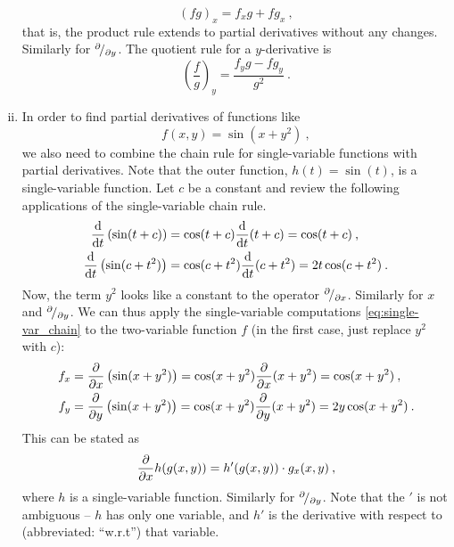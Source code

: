 \begin{remark}
\begin{enumerate}[(i)]
\[ (fg)_x  = f_xg + fg_x \:, \]
that is, the product rule extends to partial derivatives without any changes. Similarly for ${}^{\partial}\!/_{\partial y}$. The quotient rule for a $y$-derivative is
\[ \left( \frac{f}{g} \right)_y = \frac{f_y g-f g_y}{g^2} \:. \]
\item In order to find partial derivatives of functions like
\[ f(x,y) = \sin(x+y^2) \:, \]
we also need to combine the chain rule for single-variable functions with partial derivatives. Note that the outer function, $h(t)=\sin(t)$, is a single-variable function. Let $c$ be a constant and review the following applications of the single-variable chain rule.
\begin{equation}
\label{eq:single-var_chain}
\begin{split}
\displaystyle{\frac{\mathrm{d}}{\mathrm{d}t}}\left(\sin(t+c)\right) & = \cos(t+c) \displaystyle{\frac{\mathrm{d}}{\mathrm{d}t}} (t+c) = \cos(t+c) \:,  \\
\displaystyle{\frac{\mathrm{d}}{\mathrm{d}t}}\left(\sin(c+t^2)\right) & = \cos(c+t^2) \displaystyle{\frac{\mathrm{d}}{\mathrm{d}t}} (c+t^2) = 2t\cos(c+t^2) \:.
\end{split}
\end{equation}
Now, the term $y^2$ looks like a constant to the operator ${}^{\partial}\!/_{\partial x}$. Similarly for $x$ and ${}^{\partial}\!/_{\partial y}$. We can thus apply the single-variable computations \eqref{eq:single-var_chain} to the two-variable function $f$ (in the first case, just replace $y^2$ with $c$):
\begin{equation*}
\begin{split}
f_x & = \displaystyle{\frac{\partial }{\partial x}}\left(\sin(x+y^2)\right) = \cos(x+y^2) \displaystyle{\frac{\partial }{\partial x}} (x+y^2) = \cos(x+y^2) \:,  \\
f_y & = \displaystyle{\frac{\partial }{\partial y}}\left(\sin(x+y^2)\right) = \cos(x+y^2) \displaystyle{\frac{\partial }{\partial y}} (x+y^2) = 2y\cos(x+y^2) \:.
\end{split}
\end{equation*}
This can be stated as
\[ \displaystyle{\frac{\partial }{\partial x}} h(g(x,y)) = h'(g(x,y)) \cdot g_x(x,y) \:, \]
where $h$ is a single-variable function. Similarly for ${}^{\partial}\!/_{\partial y}$. Note that the $'$ is not ambiguous -- $h$ has only one variable, and $h'$ is the derivative with respect to (abbreviated: ``w.r.t'') that variable.
\end{enumerate}
\end{remark}

